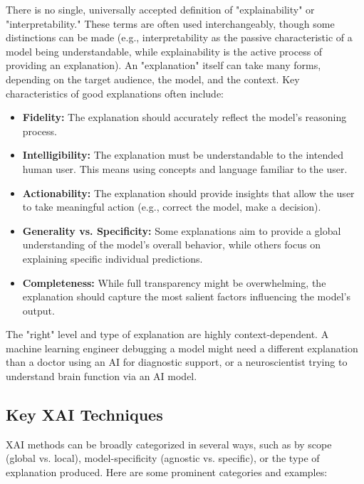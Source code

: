 \documentclass[11pt,a4paper]{article}
\begin{document}
There is no single, universally accepted definition of "explainability" or "interpretability." These terms are often used interchangeably, though some distinctions can be made (e.g., interpretability as the passive characteristic of a model being understandable, while explainability is the active process of providing an explanation). An "explanation" itself can take many forms, depending on the target audience, the model, and the context. Key characteristics of good explanations often include:
\begin{itemize}
    \item \textbf{Fidelity:} The explanation should accurately reflect the model's reasoning process.
    \item \textbf{Intelligibility:} The explanation must be understandable to the intended human user. This means using concepts and language familiar to the user.
    \item \textbf{Actionability:} The explanation should provide insights that allow the user to take meaningful action (e.g., correct the model, make a decision).
    \item \textbf{Generality vs. Specificity:} Some explanations aim to provide a global understanding of the model's overall behavior, while others focus on explaining specific individual predictions.
    \item \textbf{Completeness:} While full transparency might be overwhelming, the explanation should capture the most salient factors influencing the model's output.
\end{itemize}
The "right" level and type of explanation are highly context-dependent. A machine learning engineer debugging a model might need a different explanation than a doctor using an AI for diagnostic support, or a neuroscientist trying to understand brain function via an AI model.

\subsection{Key XAI Techniques}

XAI methods can be broadly categorized in several ways, such as by scope (global vs. local), model-specificity (agnostic vs. specific), or the type of explanation produced. Here are some prominent categories and examples:
\end{document}
